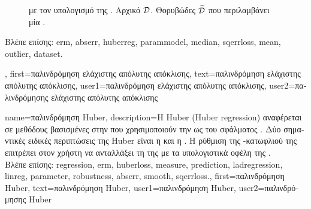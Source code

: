{{\begin{figure}[H]
{{{			με τον υπολογισμό της} . 
			 \foreignlanguage{greek}{Αρχικό}  $\mathcal{D}$.  
			\foreignlanguage{greek}{Θορυβώδες}  $\widetilde{\mathcal{D}}$ \foreignlanguage{greek}{που 
			περιλαμβάνει μία} . \label{fig_lad_dict}} }
		\end{figure}
		\foreignlanguage{greek}{Βλέπε επίσης:} \gls{erm}, \gls{abserr}, \gls{huberreg}, \gls{parammodel}, \gls{median}, \gls{sqerrloss}, 
		\gls{mean}, \gls{outlier}, \gls{dataset}.},
	first={\foreignlanguage{greek}{παλινδρόμηση ελάχιστης απόλυτης απόκλισης}},
	text={\foreignlanguage{greek}{παλινδρόμηση ελάχιστης απόλυτης απόκλισης}},
	user1={\foreignlanguage{greek}{παλινδρόμηση ελάχιστης απόλυτης απόκλισης}}, %
	user2={\foreignlanguage{greek}{παλινδρόμησης ελάχιστης απόλυτης απόκλισης}} %
}

{name={\foreignlanguage{greek}{παλινδρόμηση} Huber},
	description={\foreignlanguage{greek}{Η}  Huber 
		(Huber regression) \cite{huber1992robust} \foreignlanguage{greek}{αναφέρεται σε μεθόδους βασισμένες στην}  
		\foreignlanguage{greek}{που χρησιμοποιούν την}  \foreignlanguage{greek}{ως}  
		\foreignlanguage{greek}{του σφάλματος} . \foreignlanguage{greek}{Δύο σημαντικές ειδικές περιπτώσεις της} 
		 Huber \foreignlanguage{greek}{είναι η}  \foreignlanguage{greek}{και η} 
		. \foreignlanguage{greek}{Η ρύθμιση της} -\foreignlanguage{greek}{κατωφλιού 
		της}  \foreignlanguage{greek}{επιτρέπει στον χρήστη να ανταλλάξει τη}  
		\foreignlanguage{greek}{της}  \foreignlanguage{greek}{με τα υπολογιστικά οφέλη της}  
		.
		\\
		\foreignlanguage{greek}{Βλέπε επίσης:} \gls{regression}, \gls{erm}, \gls{huberloss}, \gls{measure}, \gls{prediction}, \gls{ladregression}, 
		\gls{linreg}, \gls{parameter}, \gls{robustness}, \gls{abserr}, \gls{smooth}, \gls{sqerrloss}.},
	first={\foreignlanguage{greek}{παλινδρόμηση} Huber},
	text={\foreignlanguage{greek}{παλινδρόμηση} Huber},
	user1={\foreignlanguage{greek}{παλινδρόμηση} Huber}, %
	user2={\foreignlanguage{greek}{παλινδρόμησης} Huber} %
}

